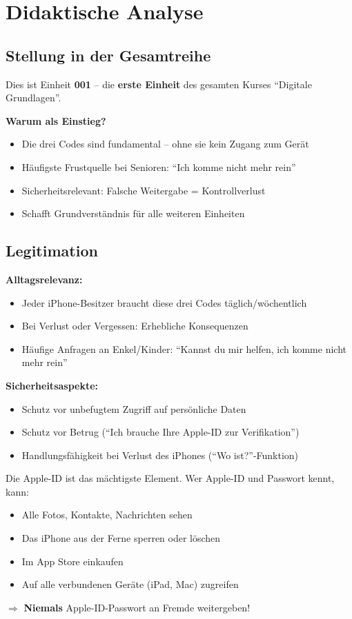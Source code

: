 \documentclass[11pt,a4paper]{article}
\begin{document}
\section{Didaktische Analyse}

\subsection{Stellung in der Gesamtreihe}

Dies ist Einheit \textbf{001} -- die \textbf{erste Einheit} des gesamten Kurses ``Digitale Grundlagen''.

\textbf{Warum als Einstieg?}
\begin{itemize}
    \item Die drei Codes sind fundamental -- ohne sie kein Zugang zum Gerät
    \item Häufigste Frustquelle bei Senioren: ``Ich komme nicht mehr rein''
    \item Sicherheitsrelevant: Falsche Weitergabe = Kontrollverlust
    \item Schafft Grundverständnis für alle weiteren Einheiten
\end{itemize}

\subsection{Legitimation}

\textbf{Alltagsrelevanz:}
\begin{itemize}
    \item Jeder iPhone-Besitzer braucht diese drei Codes täglich/wöchentlich
    \item Bei Verlust oder Vergessen: Erhebliche Konsequenzen
    \item Häufige Anfragen an Enkel/Kinder: ``Kannst du mir helfen, ich komme nicht mehr rein''
\end{itemize}

\textbf{Sicherheitsaspekte:}
\begin{itemize}
    \item Schutz vor unbefugtem Zugriff auf persönliche Daten
    \item Schutz vor Betrug (``Ich brauche Ihre Apple-ID zur Verifikation'')
    \item Handlungsfähigkeit bei Verlust des iPhones (``Wo ist?''-Funktion)
\end{itemize}

\begin{warnbox}[Sicherheitskritisch]
Die Apple-ID ist das mächtigste Element. Wer Apple-ID und Passwort kennt, kann:
\begin{itemize}
    \item Alle Fotos, Kontakte, Nachrichten sehen
    \item Das iPhone aus der Ferne sperren oder löschen
    \item Im App Store einkaufen
    \item Auf alle verbundenen Geräte (iPad, Mac) zugreifen
\end{itemize}
$\Rightarrow$ \textbf{Niemals} Apple-ID-Passwort an Fremde weitergeben!
\end{warnbox}
\end{document}
